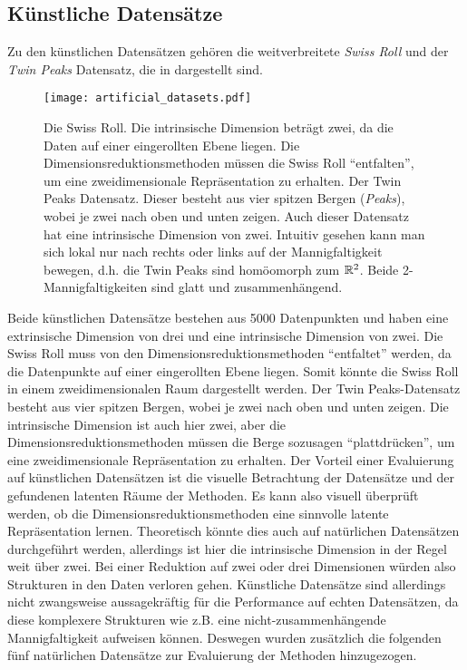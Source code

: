 \subsection{Künstliche Datensätze}
\label{ch:Vergleich:sec:VerwendeteDatensaetze:kuenstlich}
Zu den künstlichen Datensätzen gehören die weitverbreitete \textit{Swiss Roll} und der \textit{Twin Peaks} Datensatz, die in  dargestellt sind.
\begin{figure}[htb]
	\begin{center}
		\texttt{[image: artificial\_datasets.pdf]}
	\end{center}
	\caption[Künstliche Datensätze]{\figleft Die Swiss Roll. Die intrinsische Dimension beträgt zwei, da die Daten auf einer eingerollten Ebene liegen. Die Dimensionsreduktionsmethoden müssen die Swiss Roll \enquote{entfalten}, um eine zweidimensionale Repräsentation zu erhalten. \figright Der Twin Peaks Datensatz. Dieser besteht aus vier spitzen Bergen (\textit{Peaks}), wobei je zwei nach oben und unten zeigen. Auch dieser Datensatz hat eine intrinsische Dimension von zwei. Intuitiv gesehen kann man sich lokal nur nach rechts oder links auf der Mannigfaltigkeit bewegen, d.h. die Twin Peaks sind homöomorph zum $\mathbb{R}^2$. Beide 2-Mannigfaltigkeiten sind glatt und zusammenhängend.}
	\label{fig:ArtificialDatasets}
\end{figure}
Beide künstlichen Datensätze bestehen aus \num{5000} Datenpunkten und haben eine extrinsische Dimension von drei und eine intrinsische
Dimension von zwei. Die Swiss Roll muss von den Dimensionsreduktionsmethoden \enquote{entfaltet} werden, da die Datenpunkte auf einer eingerollten Ebene liegen. Somit könnte die Swiss Roll in einem zweidimensionalen Raum dargestellt werden. Der Twin Peaks-Datensatz besteht aus vier spitzen Bergen, wobei je zwei nach oben und unten zeigen. Die intrinsische Dimension ist auch hier zwei, aber die Dimensionsreduktionsmethoden müssen die Berge sozusagen \enquote{plattdrücken}, um eine zweidimensionale Repräsentation zu erhalten. Der Vorteil einer Evaluierung auf künstlichen Datensätzen ist die visuelle Betrachtung der Datensätze und der gefundenen
latenten Räume der Methoden. Es kann also visuell überprüft werden, ob die Dimensionsreduktionsmethoden eine sinnvolle latente Repräsentation lernen. Theoretisch könnte dies auch auf natürlichen Datensätzen durchgeführt werden, allerdings ist hier die intrinsische Dimension in der Regel weit über zwei. Bei einer Reduktion auf zwei oder drei Dimensionen würden also Strukturen in den Daten verloren gehen. Künstliche Datensätze sind allerdings nicht zwangsweise aussagekräftig für die Performance auf echten Datensätzen, da diese komplexere Strukturen wie z.B. eine nicht-zusammenhängende Mannigfaltigkeit aufweisen können. Deswegen wurden zusätzlich die folgenden fünf natürlichen Datensätze zur Evaluierung der Methoden hinzugezogen.

